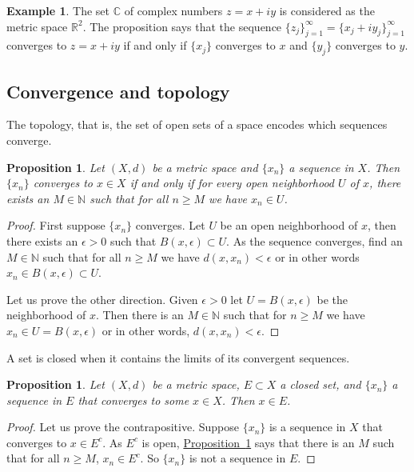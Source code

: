 \documentclass[12pt,openany]{book}
\newcommand{\C}{{\mathbb{C}}}
\newcommand{\R}{{\mathbb{R}}}
\newcommand{\N}{{\mathbb{N}}}
\theoremstyle{plain}
\newtheorem{prop}[thm]{Proposition}
\theoremstyle{remark}
\theoremstyle{definition}
\theoremstyle{exercise}
\theoremstyle{example}
\newtheorem{example}[thm]{Example}
\newcommand{\propref}[1]{\hyperref[#1]{Proposition~\ref*{#1}}}
\begin{document}
\begin{example}
The set $\C$ of complex numbers $z = x+iy$ is considered 
as the metric space $\R^2$.  The proposition says that the
sequence $\{ z_j \}_{j=1}^\infty = \{ x_j + iy_j \}_{j=1}^\infty$ converges
to $z = x+iy$
if and only if $\{ x_j \}$ converges to $x$ and 
$\{ y_j \}$ converges to $y$.
\end{example}

\subsection{Convergence and topology}

The topology, that is, the set of open sets of a space encodes which
sequences converge.

\begin{prop} \label{prop:msconvtopo}
Let $(X,d)$ be a metric space and $\{x_n\}$ a sequence in $X$.  Then
$\{ x_n \}$ converges to $x \in X$ if and only if for every open neighborhood
$U$ of $x$, there exists an $M \in \N$ such that for all $n \geq M$
we have $x_n \in U$.
\end{prop}

\begin{proof}
First suppose $\{ x_n \}$ converges.  Let $U$ be an open neighborhood
of $x$, then there exists an $\epsilon > 0$ such that $B(x,\epsilon) \subset
U$.  As the sequence converges, find an $M \in \N$ such that for all $n \geq
M$ we have $d(x,x_n) < \epsilon$ or in other words $x_n \in B(x,\epsilon)
\subset U$.

Let us prove the other direction.  Given $\epsilon > 0$ let $U =
B(x,\epsilon)$ be the neighborhood of $x$.  Then there is an $M \in \N$
such that for $n \geq M$ we have $x_n \in U = B(x,\epsilon)$ or in other
words, $d(x,x_n) < \epsilon$.
\end{proof}

A set is closed when it contains the limits of its convergent sequences.

\begin{prop} \label{prop:msclosedlim}
Let $(X,d)$ be a metric space, $E \subset X$ a closed set,
and $\{ x_n \}$ a sequence in $E$ that converges to some $x \in X$.
Then $x \in E$.
\end{prop}

\begin{proof}
Let us prove the contrapositive.
Suppose $\{ x_n \}$ is a sequence in $X$ that converges to $x \in E^c$.
As $E^c$ is open, \propref{prop:msconvtopo} says that there is
an $M$ such that for all $n \geq M$,
$x_n \in E^c$.  So $\{ x_n \}$  is not a sequence in $E$.
\end{proof}
\end{document}
